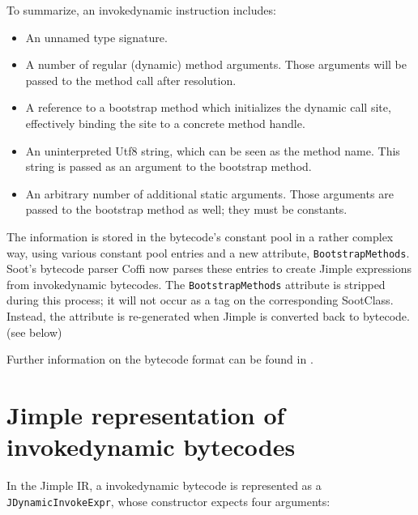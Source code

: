 \documentclass{article}
\newcommand{\id}{invokedynamic\xspace}
\begin{document}
To summarize,
an \id instruction includes:
\begin{itemize}
  \item An unnamed type signature.
  \item A number of regular (dynamic) method arguments. Those arguments will be
  passed to the method call after resolution.
  \item A reference to a bootstrap method which initializes the dynamic call site,
  effectively binding the site to a concrete method handle.
  \item An uninterpreted Utf8 string, which can be seen as the method name. This
  string is passed as an argument to the bootstrap method. 
  \item An arbitrary number of additional static arguments. Those arguments are
  passed to the bootstrap method as well; they must be constants.
\end{itemize} 

The information is stored in the bytecode's constant pool in a rather complex
way, using various constant pool entries and a new attribute,
 \texttt{BootstrapMethods}. Soot's bytecode parser Coffi now parses these
entries to create Jimple expressions from invokedynamic bytecodes.
The \texttt{BootstrapMethods} attribute is stripped during this process; it will
not occur as a tag on the corresponding SootClass. Instead, the attribute is
re-generated when Jimple is converted back to bytecode. (see below)

Further information on the bytecode format can be found in
.

\section{Jimple representation of invokedynamic bytecodes}

In the Jimple IR, a invokedynamic bytecode is represented as a
\texttt{JDynamicInvokeExpr}, whose constructor expects four arguments:
\end{document}
